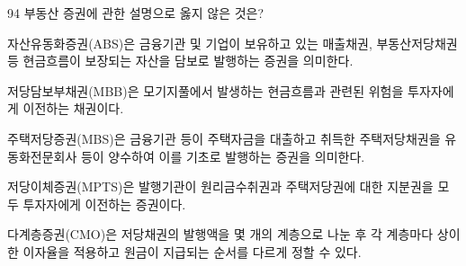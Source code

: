\begin{question}{94}
부동산 증권에 관한 설명으로 옳지 않은 것은?
\begin{choices}
  \item 자산유동화증권(ABS)은 금융기관 및 기업이 보유하고 있는 매출채권, 부동산저당채권 등 현금흐름이 보장되는 자산을 담보로 발행하는 증권을 의미한다.
  \item 저당담보부채권(MBB)은 모기지풀에서 발생하는 현금흐름과 관련된 위험을 투자자에게 이전하는 채권이다.
  \item 주택저당증권(MBS)은 금융기관 등이 주택자금을 대출하고 취득한 주택저당채권을 유동화전문회사 등이 양수하여 이를 기초로 발행하는 증권을 의미한다.
  \item 저당이체증권(MPTS)은 발행기관이 원리금수취권과 주택저당권에 대한 지분권을 모두 투자자에게 이전하는 증권이다.
  \item 다계층증권(CMO)은 저당채권의 발행액을 몇 개의 계층으로 나눈 후 각 계층마다 상이한 이자율을 적용하고 원금이 지급되는 순서를 다르게 정할 수 있다.
\end{choices}
\end{question}
